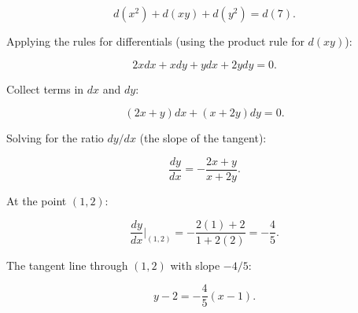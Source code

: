 \documentclass[12pt]{exam}
\begin{document}
\begin{questions}
$$d(x^2) + d(xy) + d(y^2) = d(7).$$

Applying the rules for differentials (using the product rule for $d(xy)$):

$$2xdx + xdy + ydx + 2ydy = 0.$$

Collect terms in $dx$ and $dy$:

$$(2x + y)dx + (x + 2y)dy = 0.$$

Solving for the ratio $dy/dx$ (the slope of the tangent):

$$\frac{dy}{dx} = -\frac{2x+y}{x+2y}.$$

At the point $(1, 2)$:

$$\frac{dy}{dx}\bigg|_{(1,2)} = -\frac{2(1)+2}{1+2(2)} = -\frac{4}{5}.$$

The tangent line through $(1,2)$ with slope $-4/5$:

$$y - 2 = -\frac{4}{5}(x-1).$$
\end{questions}
\end{document}
